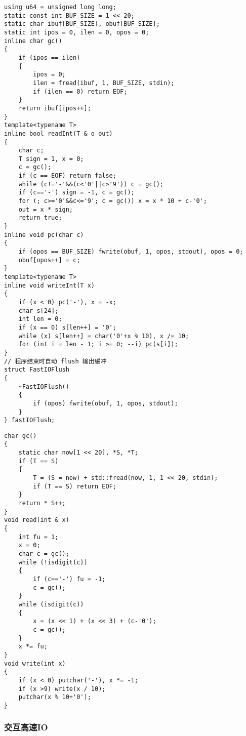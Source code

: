 \documentclass[a4paper, fontset=none]{ctexart}
\begin{document}
\begin{verbatim}
using u64 = unsigned long long;
static const int BUF_SIZE = 1 << 20;
static char ibuf[BUF_SIZE], obuf[BUF_SIZE];
static int ipos = 0, ilen = 0, opos = 0;
inline char gc()
{
    if (ipos == ilen)
    {
        ipos = 0;
        ilen = fread(ibuf, 1, BUF_SIZE, stdin);
        if (ilen == 0) return EOF;
    }
    return ibuf[ipos++];
}
template<typename T>
inline bool readInt(T & o out)
{
    char c;
    T sign = 1, x = 0;
    c = gc();
    if (c == EOF) return false;
    while (c!='-'&&(c<'0'||c>'9')) c = gc();
    if (c=='-') sign = -1, c = gc();
    for (; c>='0'&&c<='9'; c = gc()) x = x * 10 + c-'0';
    out = x * sign;
    return true;
}
inline void pc(char c)
{
    if (opos == BUF_SIZE) fwrite(obuf, 1, opos, stdout), opos = 0;
    obuf[opos++] = c;
}
template<typename T>
inline void writeInt(T x)
{
    if (x < 0) pc('-'), x = -x;
    char s[24];
    int len = 0;
    if (x == 0) s[len++] = '0';
    while (x) s[len++] = char('0'+x % 10), x /= 10;
    for (int i = len - 1; i >= 0; --i) pc(s[i]);
}
// 程序结束时自动 flush 输出缓冲
struct FastIOFlush
{
    ~FastIOFlush()
    {
        if (opos) fwrite(obuf, 1, opos, stdout);
    }
} fastIOFlush;
\end{verbatim}

\begin{verbatim}
char gc()
{
    static char now[1 << 20], *S, *T;
    if (T == S)
    {
        T = (S = now) + std::fread(now, 1, 1 << 20, stdin);
        if (T == S) return EOF;
    }
    return * S++;
}
void read(int & x)
{
    int fu = 1;
    x = 0;
    char c = gc();
    while (!isdigit(c))
    {
        if (c=='-') fu = -1;
        c = gc();
    }
    while (isdigit(c))
    {
        x = (x << 1) + (x << 3) + (c-'0');
        c = gc();
    }
    x *= fu;
}
void write(int x)
{
    if (x < 0) putchar('-'), x *= -1;
    if (x >9) write(x / 10);
    putchar(x % 10+'0');
}
\end{verbatim}
\subsubsection{交互高速IO}
\end{document}
